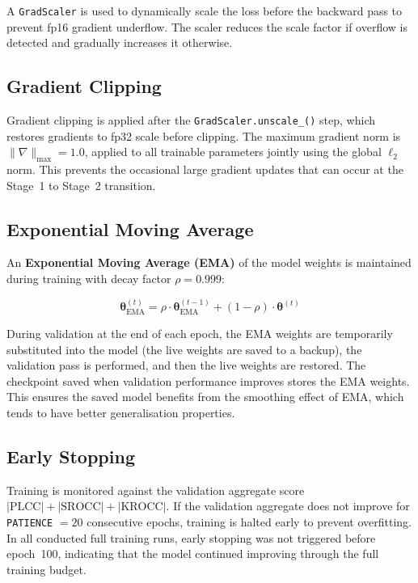 A \texttt{GradScaler} is used to dynamically scale the loss before the backward pass to
prevent fp16 gradient underflow. The scaler reduces the scale factor if overflow is
detected and gradually increases it otherwise.

\subsection{Gradient Clipping}

Gradient clipping is applied after the \texttt{GradScaler.unscale\_()} step, which
restores gradients to fp32 scale before clipping. The maximum gradient norm is
$\|\nabla\|_{\max} = 1.0$, applied to all trainable parameters jointly using the global
$\ell_2$ norm. This prevents the occasional large gradient updates that can occur at the
Stage~1 to Stage~2 transition.

\subsection{Exponential Moving Average}

An \textbf{Exponential Moving Average (EMA)} of the model weights is maintained during
training with decay factor $\rho = 0.999$:

\begin{equation}
    \boldsymbol{\theta}_{\text{EMA}}^{(t)} = \rho \cdot \boldsymbol{\theta}_{\text{EMA}}^{(t-1)}
    + (1 - \rho) \cdot \boldsymbol{\theta}^{(t)}
\end{equation}

During validation at the end of each epoch, the EMA weights are temporarily substituted
into the model (the live weights are saved to a backup), the validation pass is
performed, and then the live weights are restored. The checkpoint saved when validation
performance improves stores the EMA weights. This ensures the saved model benefits from
the smoothing effect of EMA, which tends to have better generalisation properties.

\subsection{Early Stopping}

Training is monitored against the validation aggregate score
$|\text{PLCC}| + |\text{SROCC}| + |\text{KROCC}|$. If the validation aggregate does
not improve for \texttt{PATIENCE} $= 20$ consecutive epochs, training is halted early
to prevent overfitting. In all conducted full training runs, early stopping was not
triggered before epoch~100, indicating that the model continued improving through the
full training budget.

